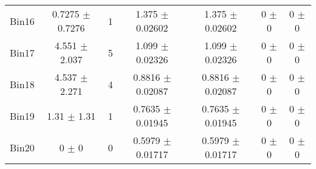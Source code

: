 \begin{tabular}{@{\extracolsep{4pt}}lcccccc@{}}
     Bin16 & 0.7275 $\pm$ 0.7276 & 1 & 1.375 $\pm$ 0.02602 & 1.375 $\pm$ 0.02602 & 0 $\pm$ 0 & 0 $\pm$ 0 \\ 
     Bin17 & 4.551 $\pm$ 2.037 & 5 & 1.099 $\pm$ 0.02326 & 1.099 $\pm$ 0.02326 & 0 $\pm$ 0 & 0 $\pm$ 0 \\ 
     Bin18 & 4.537 $\pm$ 2.271 & 4 & 0.8816 $\pm$ 0.02087 & 0.8816 $\pm$ 0.02087 & 0 $\pm$ 0 & 0 $\pm$ 0 \\ 
     Bin19 & 1.31 $\pm$ 1.31 & 1 & 0.7635 $\pm$ 0.01945 & 0.7635 $\pm$ 0.01945 & 0 $\pm$ 0 & 0 $\pm$ 0 \\ 
     Bin20 & 0 $\pm$ 0 & 0 & 0.5979 $\pm$ 0.01717 & 0.5979 $\pm$ 0.01717 & 0 $\pm$ 0 & 0 $\pm$ 0 \\ 
\hline\hline
  \end{tabular}
